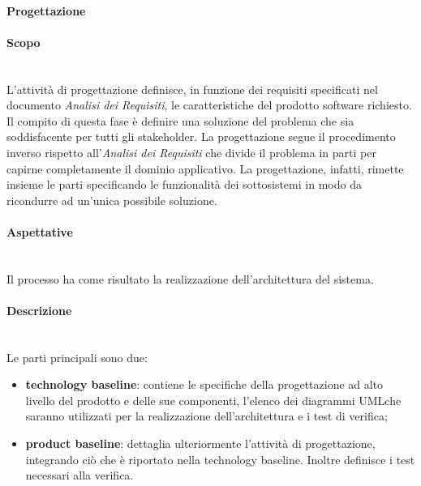 \paragraph{Progettazione} 
\paragraph*{Scopo} \mbox{}\\

\noindent L'attività di progettazione definisce, in funzione dei requisiti specificati 
nel documento \textit{Analisi dei Requisiti}, le caratteristiche del prodotto 
software richiesto. Il compito di questa fase è definire una soluzione del 
problema che sia soddisfacente per tutti gli stakeholder. La progettazione segue 
il procedimento inverso rispetto all'\textit{Analisi dei Requisiti} che divide 
il problema in parti per capirne completamente il dominio applicativo. La 
progettazione, infatti, rimette insieme le parti specificando le funzionalità 
dei sottosistemi in modo da ricondurre ad un'unica possibile soluzione. \newline 


\paragraph*{Aspettative} \mbox{}\\

\noindent Il processo ha come risultato la realizzazione dell'architettura del sistema. 
\newline

\paragraph*{Descrizione}  \mbox{}\\

\noindent Le parti principali sono due:
	\begin{itemize}
		\item \textbf{technology baseline}: contiene le specifiche della 
			progettazione ad alto livello del prodotto e delle sue componenti, l'elenco dei 
			diagrammi UML\glosp che saranno utilizzati per la realizzazione 
			dell'architettura e i test di verifica;
		\item \textbf{product baseline}: dettaglia ulteriormente l'attività di 
			progettazione, integrando ciò che è riportato nella technology baseline. Inoltre 
			definisce i test necessari alla verifica. \newline
	\end{itemize}


